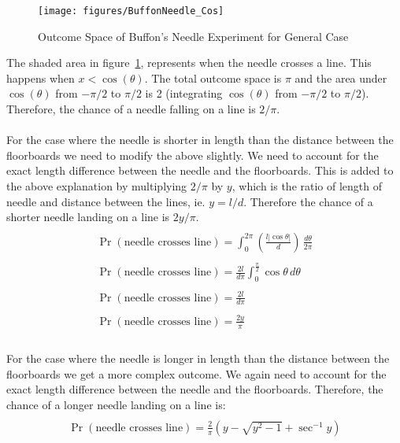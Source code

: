 \begin{figure}[h]
\begin{center}
\texttt{[image: figures/BuffonNeedle\_Cos]}
\caption{Outcome Space of Buffon's Needle Experiment for General Case\label{BGC}}
\end{center}
\end{figure}

\noindent
The shaded area in figure~\ref{BGC}, represents when the needle crosses a line. This happens when
$x< \cos(\theta)$. The total outcome space is $\pi$ and the area under $\cos(\theta)$ from $-\pi/2$ to $\pi/2$ is 2 (integrating $\cos(\theta)$ from $-\pi/2$ to $\pi/2$). Therefore, the chance of a needle falling on a line is $2/\pi$.\\
\\
For the case where the needle is shorter in length than the distance between the floorboards we need to modify the above slightly. We need to account for the exact length difference between the needle and the floorboards. This is added to the above explanation by multiplying $2/\pi$ by $y$, which is the ratio of length of needle and distance between the lines, ie. $y=l/d$. Therefore the chance of a shorter needle landing on a line is $2y/\pi$.
\begin{displaymath}
\begin{array}{l}
\\\Pr(\text{needle crosses line})=\displaystyle\int^{2\pi}_0 (\frac{l|\cos\theta|}{d})\,\frac{d\theta}{2\pi}\\
\\\Pr (\text{needle crosses line}) =\displaystyle\frac{2l}{d\pi}\int^{\frac{\pi}{2}}_0 \cos\theta\,d\theta\\
\\\Pr (\text{needle crosses line}) =\displaystyle\frac{2l}{d\pi}\\
\\\Pr (\text{needle crosses line}) =\displaystyle\frac{2y}{\pi}\\
\end{array}
\end{displaymath}
\\
\noindent
For the case where the needle is longer in length than the distance between the floorboards we get a more complex outcome. We again need to account for the exact length difference between the needle and the floorboards. Therefore, the chance of a longer needle landing on a line is:
\begin{displaymath}
\begin{array}{l}
\\\Pr (\text{needle crosses line}) =\frac{2}{\pi}({y-\sqrt{y^2-1}+\sec^{-1}y})\\
\end{array}
\end{displaymath}

